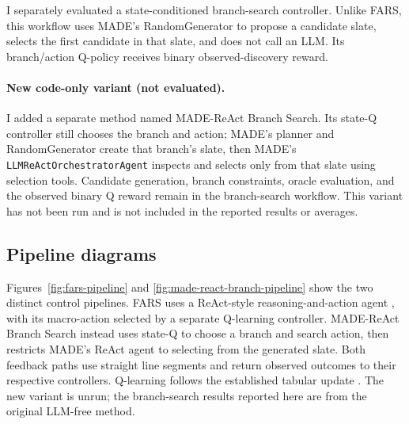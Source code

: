 \documentclass[11pt,a4paper]{article}
\begin{document}
I separately evaluated a state-conditioned branch-search controller. Unlike
FARS, this workflow uses MADE's RandomGenerator to propose a candidate slate,
selects the first candidate in that slate, and does not call an LLM. Its
branch/action Q-policy receives binary observed-discovery reward.

\paragraph{New code-only variant (not evaluated).}
I added a separate method named MADE-ReAct Branch Search. Its state-Q
controller still chooses the branch and action; MADE's planner and
RandomGenerator create that branch's slate, then MADE's
\texttt{LLMReActOrchestratorAgent} inspects and selects only from that slate
using selection tools. Candidate generation, branch constraints, oracle
evaluation, and the observed binary Q reward remain in the branch-search
workflow. This variant has not been run and is not included in the reported
results or averages.

\subsection{Pipeline diagrams}
Figures~\ref{fig:fars-pipeline} and
\ref{fig:made-react-branch-pipeline} show the two distinct control
pipelines. FARS uses a ReAct-style reasoning-and-action agent
\cite{react}, with its macro-action selected by a separate Q-learning
controller. MADE-ReAct Branch Search instead uses state-Q to choose a
branch and search action, then restricts MADE's ReAct agent to selecting
from the generated slate. Both feedback paths use straight line segments
and return observed outcomes to their respective controllers. Q-learning
follows the established tabular update \cite{watkins}. The new variant is
unrun; the branch-search results reported here are from the original
LLM-free method.
\end{document}
